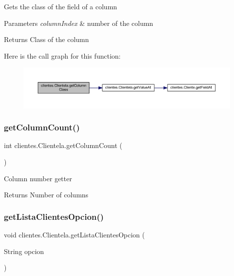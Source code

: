 Gets the class of the field of a column 
\begin{DoxyParams}{Parameters}
{\em column\+Index} & number of the column \\
\hline
\end{DoxyParams}
\begin{DoxyReturn}{Returns}
Class of the column 
\end{DoxyReturn}
Here is the call graph for this function\+:\nopagebreak
\begin{figure}[H]
\begin{center}
\leavevmode
\includegraphics[width=350pt]{classclientes_1_1_clientela_af7d9f77f6b5b1582fcdb4df4b92551fd_cgraph}
\end{center}
\end{figure}
\mbox{\label{classclientes_1_1_clientela_a43ca9c21c992f1bd25544b5cc6d1ed0e}} 
\subsubsection{\texorpdfstring{get\+Column\+Count()}{getColumnCount()}}
{\footnotesize\ttfamily int clientes.\+Clientela.\+get\+Column\+Count (\begin{DoxyParamCaption}{ }\end{DoxyParamCaption})}

Column number getter \begin{DoxyReturn}{Returns}
Number of columns 
\end{DoxyReturn}
\mbox{\label{classclientes_1_1_clientela_a8275e9ef86c96a9070cff779e5a0169e}} 
\subsubsection{\texorpdfstring{get\+Lista\+Clientes\+Opcion()}{getListaClientesOpcion()}}
{\footnotesize\ttfamily void clientes.\+Clientela.\+get\+Lista\+Clientes\+Opcion (\begin{DoxyParamCaption}\item[{String}]{opcion }\end{DoxyParamCaption})}

